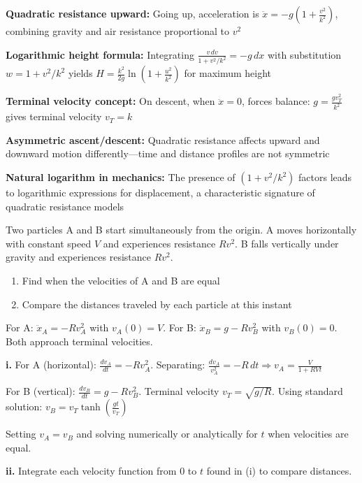 \begin{takeaways}
\item \textbf{Quadratic resistance upward:} Going up, acceleration is $\ddot{x} = -g\left(1 + \frac{v^2}{k^2}\right)$, combining gravity and air resistance proportional to $v^2$
\item \textbf{Logarithmic height formula:} Integrating $\frac{v\,dv}{1+v^2/k^2} = -g\,dx$ with substitution $w = 1 + v^2/k^2$ yields $H = \frac{k^2}{2g}\ln\left(1+\frac{u^2}{k^2}\right)$ for maximum height
\item \textbf{Terminal velocity concept:} On descent, when $\ddot{x} = 0$, forces balance: $g = \frac{gv_T^2}{k^2}$ gives terminal velocity $v_T = k$
\item \textbf{Asymmetric ascent/descent:} Quadratic resistance affects upward and downward motion differently—time and distance profiles are not symmetric
\item \textbf{Natural logarithm in mechanics:} The presence of $(1 + v^2/k^2)$ factors leads to logarithmic expressions for displacement, a characteristic signature of quadratic resistance models
\end{takeaways}

\begin{problem}
Two particles A and B start simultaneously from the origin. A moves horizontally with constant speed $V$ and experiences resistance $Rv^2$. B falls vertically under gravity and experiences resistance $Rv^2$.

\begin{enumerate}[label=\textbf{\roman*.}]
    \item Find when the velocities of A and B are equal
    \item Compare the distances traveled by each particle at this instant
\end{enumerate}
\end{problem}

\begin{hint}
For A: $\ddot{x}_A = -Rv_A^2$ with $v_A(0) = V$. For B: $\ddot{x}_B = g - Rv_B^2$ with $v_B(0) = 0$. Both approach terminal velocities.
\end{hint}

\begin{solution}
\textbf{i.} For A (horizontal): $\frac{dv_A}{dt} = -Rv_A^2$. Separating: $\frac{dv_A}{v_A^2} = -R\,dt \Rightarrow v_A = \frac{V}{1+RVt}$

For B (vertical): $\frac{dv_B}{dt} = g - Rv_B^2$. Terminal velocity $v_T = \sqrt{g/R}$. Using standard solution: $v_B = v_T\tanh\left(\frac{gt}{v_T}\right)$

Setting $v_A = v_B$ and solving numerically or analytically for $t$ when velocities are equal.

\textbf{ii.} Integrate each velocity function from $0$ to $t$ found in (i) to compare distances.
\end{solution}

